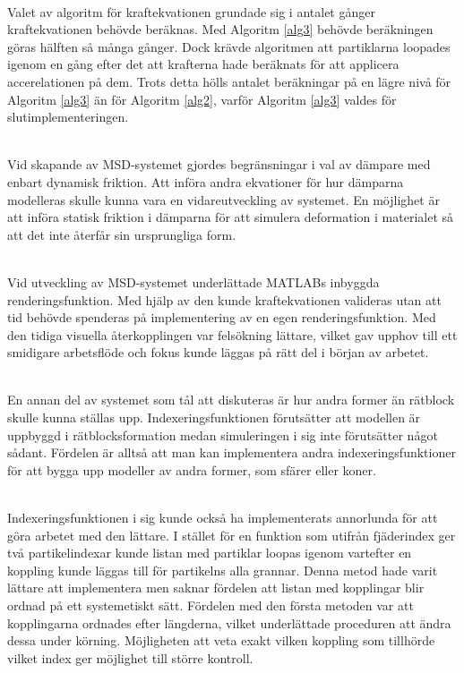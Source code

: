 \documentclass[a4paper,12pt,oneside,final,swedish]{extarticle}
\begin{document}
\noindent\\Valet av algoritm för kraftekvationen grundade sig i antalet gånger kraftekvationen behövde beräknas. Med Algoritm \ref{alg3} behövde beräkningen göras hälften så många gånger. Dock krävde algoritmen att partiklarna loopades igenom en gång efter det att krafterna hade beräknats för att applicera accerelationen på dem. Trots detta hölls antalet beräkningar på en lägre nivå för Algoritm \ref{alg3} än för Algoritm \ref{alg2}, varför Algoritm \ref{alg3} valdes för slutimplementeringen.

\noindent\\Vid skapande av MSD-systemet gjordes begränsningar i val av dämpare med enbart dynamisk friktion. Att införa andra ekvationer för hur dämparna modelleras skulle kunna vara en vidareutveckling av systemet. En möjlighet är att införa statisk friktion i dämparna för att simulera deformation i materialet så att det inte återfår sin ursprungliga form.

\noindent\\Vid utveckling av MSD-systemet underlättade MATLABs inbyggda renderingsfunktion. Med hjälp av den kunde kraftekvationen valideras utan att tid behövde spenderas på implementering av en egen renderingsfunktion. Med den tidiga visuella återkopplingen var felsökning lättare, vilket gav upphov till ett smidigare arbetsflöde och fokus kunde läggas på rätt del i början av arbetet.

\noindent\\En annan del av systemet som tål att diskuteras är hur andra former än rätblock skulle kunna ställas upp. Indexeringsfunktionen förutsätter att modellen är uppbyggd i rätblocksformation medan simuleringen i sig inte förutsätter något sådant. Fördelen är alltså att man kan implementera andra indexeringsfunktioner för att bygga upp modeller av andra former, som sfärer eller koner.

\noindent\\Indexeringsfunktionen i sig kunde också ha implementerats annorlunda för att göra arbetet med den lättare. I stället för en funktion som utifrån fjäderindex ger två partikelindexar kunde listan med partiklar loopas igenom vartefter en koppling kunde läggas till för partikelns alla grannar. Denna metod hade varit lättare att implementera men saknar fördelen att listan med kopplingar blir ordnad på ett systemetiskt sätt. Fördelen med den första metoden var att kopplingarna ordnades efter längderna, vilket underlättade proceduren att ändra dessa under körning. Möjligheten att veta exakt vilken koppling som tillhörde vilket index ger möjlighet till större kontroll.
\end{document}
